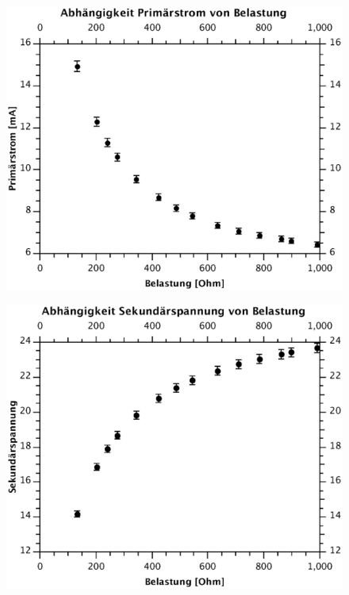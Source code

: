 \documentclass{article}
\begin{document}
\begin{figure}
\includegraphics[scale=0.6]{Plot-Strom-Belastung.eps}
\end{figure}
\begin{figure}
\includegraphics[scale=0.6]{Plot-Spannung-Belastung.eps}
\end{figure}
\end{document}
